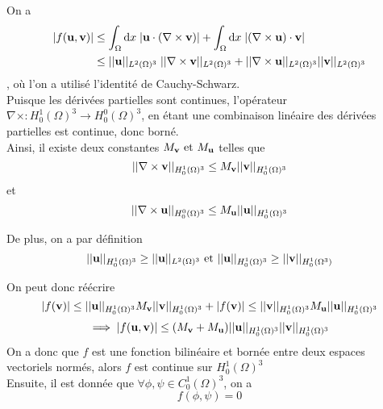 \documentclass[letterpaper,12pt,oneside,final]{book}
\begin{document}
On a
\begin{equation*}
\begin{split}
	 \lvert f(\vb{u},\vb{v}) \rvert & \leq \int_{\Omega}\text{d}x\; \lvert \vb{u}\cdot (\nabla \times \vb{v} ) \rvert + \int_{\Omega}\text{d}x\; \lvert (\nabla \times \vb{u} ) \cdot \vb{v}\rvert    \\ 
	& \leq \lvert \lvert  \vb{u} \rvert \rvert_{L^{2}(\Omega)^{3}} \; \lvert \lvert  \nabla \times \vb{v} \rvert \rvert_{{L^{2}(\Omega )^{3}}} + \lvert \lvert  \nabla \times \vb{u}  \rvert \rvert_{L^{2}(\Omega )^{3}} \lvert \lvert  \vb{v} \rvert \rvert_{L^{2}(\Omega )^{3}} \\ 
\end{split}
\end{equation*}
, où l'on a utilisé l'identité de Cauchy-Schwarz. \\
Puisque les dérivées partielles sont continues, l'opérateur \( \nabla \times : H_{0}^{1}(\Omega)^{3} \rightarrow H_{0}^{0}(\Omega)^{3}\), en étant une combinaison linéaire des dérivées partielles est continue, donc borné. \\ Ainsi, il existe deux constantes 
\( M_{\vb{v}} \text{ et } M_{\vb{u}} \) telles que 
\[ \lvert \lvert  \nabla \times \vb{v}  \rvert \rvert_{H^{1}_{0}(\Omega)^{3}} \leq M_{\vb{v}} \lvert \lvert  \vb{v} \rvert \rvert_{H_{0}^{1}(\Omega)^{3}}  \] 
et 
\[ \lvert \lvert  \nabla \times \vb{u}  \rvert \rvert_{H^{0}_{0}(\Omega)^{3}} \leq M_{\vb{u}} \lvert \lvert  \vb{u} \rvert \rvert_{H_{0}^{1}(\Omega)^{3}}  \] 

De plus, on a par définition 
\[ \lvert \lvert  \vb{u} \rvert \rvert_{H_{0}^{1}(\Omega )^{3}} \geq \lvert \lvert  \vb{u} \rvert \rvert_{L^{2}(\Omega)^{3}} \text{      et      } \lvert \lvert  \vb{u} \rvert \rvert_{H_{0}^{1}(\Omega )^{3}} \geq \lvert \lvert  \vb{v} \rvert \rvert_{H_{0}^{1}(\Omega ^{3})} \]

On peut donc réécrire 
\[ \lvert f(\vb{\vb{v}}) \rvert \leq \lvert \lvert  \vb{u} \rvert \rvert_{H_{0}^{1}(\Omega )^{3}} M_{\vb{v}} \lvert \lvert  \vb{v} \rvert \rvert_{H_{0}^{1}(\Omega)^{3}} + \lvert f(\vb{\vb{v}}) \rvert \leq \lvert \lvert  \vb{v} \rvert \rvert_{H_{0}^{1}(\Omega )^{3}} M_{\vb{u}} \lvert \lvert  \vb{u} \rvert \rvert_{H_{0}^{1}(\Omega)^{3}}   \]
\[ \implies \lvert f(\vb{u},\vb{v}) \rvert \leq (M_{\vb{v}}+M_{\vb{u}}) \lvert \lvert  \vb{u} \rvert \rvert_{H_{0}^{1}(\Omega )^{3}} \lvert \lvert  \vb{v} \rvert \rvert_{H_{0}^{1}(\Omega )^{3}} \]
On a donc que \( f \) est une fonction bilinéaire et bornée entre deux espaces vectoriels normés, alors \( f \) est continue sur \( H_{0}^{1}(\Omega)^{3} \)
\\ Ensuite, il est donnée que \( \forall \phi, \psi \in C^{1}_{0}(\Omega )^{3} \), on a 
\[ f(\phi,\psi) = 0 \]
\end{document}
